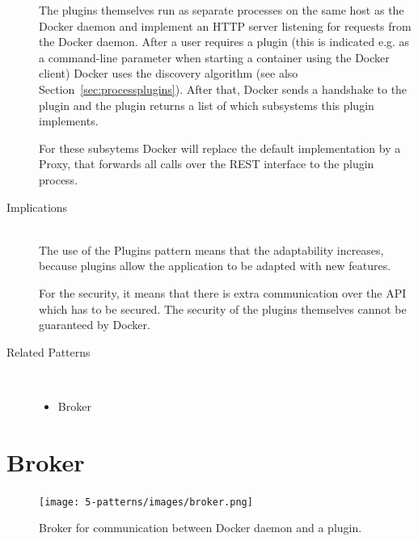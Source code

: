 \begin{description}
The plugins themselves run as separate processes on the same host as the Docker daemon and implement an HTTP server listening for requests from the Docker daemon. After a user requires a plugin (this is indicated e.g. as a command-line parameter when starting a container using the Docker client) Docker uses the discovery algorithm (see also Section~\ref{sec:processplugins}). After that, Docker sends a handshake to the plugin and the plugin returns a list of which subsystems this plugin implements.

For these subsytems Docker will replace the default implementation by a Proxy, that forwards all calls over the REST interface to the plugin process.

\item [Implications]~\\
The use of the Plugins pattern means that the adaptability increases, because plugins allow the application to be adapted with new features.

For the security, it means that there is extra communication over the API which has to be secured. The security of the plugins themselves cannot be guaranteed by Docker.

\item [Related Patterns]~
\begin{itemize}
\item Broker
\end{itemize}
\end{description}

\section{Broker}
\begin{figure}[H]
\centering
\texttt{[image: 5-patterns/images/broker.png]}
\caption{Broker for communication between Docker daemon and a plugin.}
\label{fig:broker-pattern}
\end{figure}

